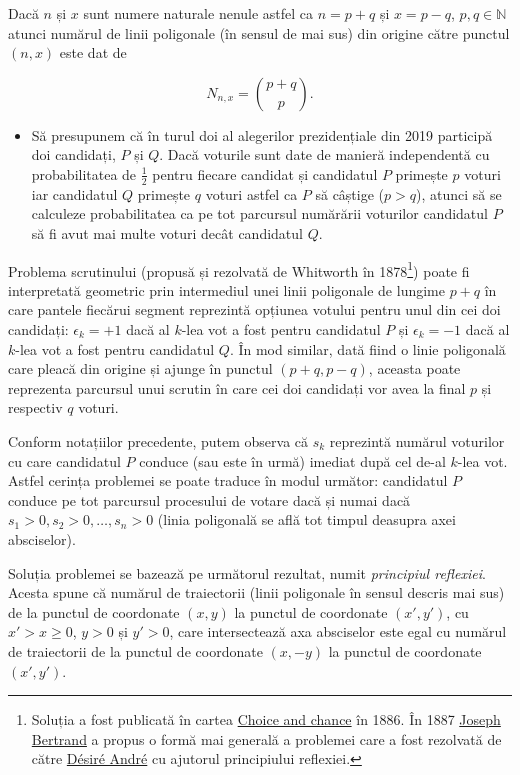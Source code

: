 \documentclass[]{article}
\let\rmarkdownfootnote\footnote%
\def\footnote{\protect\rmarkdownfootnote}
\newenvironment{frshaded*}{%
  \def\FrameCommand{\fboxrule=\FrameRule\fboxsep=\FrameSep \fcolorbox{framecolor}{shadecolor1}}%
  \MakeFramed {\advance\hsize-\width \FrameRestore}}%
{\endMakeFramed}
\newenvironment{rmdblock}[1]
  {\begin{frshaded*}
  \begin{itemize}
  \renewcommand{\labelitemi}{
    \raisebox{-.7\height}[0pt][0pt]{
      {\setkeys{Gin}{width=2em,keepaspectratio}\texttt{[image: images/icons/\#1]}}
    }
  }
  \item
  }
  {
  \end{itemize}
  \end{frshaded*}
  }
\newenvironment{rmdexercise}
  {\begin{rmdblock}{exercise}}
  {\end{rmdblock}}
\begin{document}
Dacă \(n\) și \(x\) sunt numere naturale nenule astfel ca \(n = p+q\) și
\(x = p-q\), \(p, q\in\mathbb{N}\) atunci numărul de linii poligonale
(în sensul de mai sus) din origine către punctul \((n,x)\) este dat de

\[
  N_{n,x} = \binom{p+q}{p}.
\]

\begin{rmdexercise}
Să presupunem că în turul doi al alegerilor prezidențiale din 2019
participă doi candidați, \(P\) și \(Q\). Dacă voturile sunt date de
manieră independentă cu probabilitatea de \(\frac{1}{2}\) pentru fiecare
candidat și candidatul \(P\) primește \(p\) voturi iar candidatul \(Q\)
primește \(q\) voturi astfel ca \(P\) să câștige (\(p>q\)), atunci să se
calculeze probabilitatea ca pe tot parcursul numărării voturilor
candidatul \(P\) să fi avut mai multe voturi decât candidatul \(Q\).
\end{rmdexercise}

Problema scrutinului (propusă și rezolvată de Whitworth în
1878\footnote{Soluția a fost publicată în cartea
  \href{https://ia902307.us.archive.org/21/items/choicechance00whitrich/choicechance00whitrich.pdf}{Choice
  and chance} în 1886. În 1887
  \href{http://webspace.ship.edu/msrenault/ballotproblem/French\%20Bertrand.pdf}{Joseph
  Bertrand} a propus o formă mai generală a problemei care a fost
  rezolvată de către
  \href{http://webspace.ship.edu/msrenault/ballotproblem/French\%20Andre.pdf}{Désiré
  André} cu ajutorul principiului reflexiei.}) poate fi interpretată
geometric prin intermediul unei linii poligonale de lungime \(p+q\) în
care pantele fiecărui segment reprezintă opțiunea votului pentru unul
din cei doi candidați: \(\epsilon_k = +1\) dacă al \(k\)-lea vot a fost
pentru candidatul \(P\) și \(\epsilon_k = -1\) dacă al \(k\)-lea vot a
fost pentru candidatul \(Q\). În mod similar, dată fiind o linie
poligonală care pleacă din origine și ajunge în punctul \((p+q, p-q)\),
aceasta poate reprezenta parcursul unui scrutin în care cei doi
candidați vor avea la final \(p\) și respectiv \(q\) voturi.

Conform notațiilor precedente, putem observa că \(s_k\) reprezintă
numărul voturilor cu care candidatul \(P\) conduce (sau este în urmă)
imediat după cel de-al \(k\)-lea vot. Astfel cerința problemei se poate
traduce în modul următor: candidatul \(P\) conduce pe tot parcursul
procesului de votare dacă și numai dacă \(s_1>0, s_2>0,\ldots, s_n>0\)
(linia poligonală se află tot timpul deasupra axei absciselor).

Soluția problemei se bazează pe următorul rezultat, numit
\emph{principiul reflexiei}. Acesta spune că numărul de traiectorii
(linii poligonale în sensul descris mai sus) de la punctul de coordonate
\((x,y)\) la punctul de coordonate \((x',y')\), cu \(x'>x\geq0\),
\(y>0\) și \(y'>0\), care intersectează axa absciselor este egal cu
numărul de traiectorii de la punctul de coordonate \((x,-y)\) la punctul
de coordonate \((x',y')\).
\end{document}
